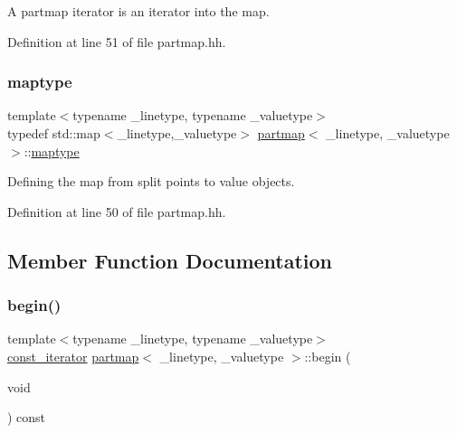 A partmap iterator is an iterator into the map. 



Definition at line 51 of file partmap.\+hh.

\mbox{\label{classpartmap_abdafeca5ddc449596a7d188791b4702f}} 
\subsubsection{\texorpdfstring{maptype}{maptype}}
{\footnotesize\ttfamily template$<$typename \+\_\+linetype, typename \+\_\+valuetype$>$ \\
typedef std\+::map$<$\+\_\+linetype,\+\_\+valuetype$>$ \mbox{\hyperlink{classpartmap}{partmap}}$<$ \+\_\+linetype, \+\_\+valuetype $>$\+::\mbox{\hyperlink{classpartmap_abdafeca5ddc449596a7d188791b4702f}{maptype}}}



Defining the map from split points to value objects. 



Definition at line 50 of file partmap.\+hh.



\subsection{Member Function Documentation}
\mbox{\label{classpartmap_a8c5b499b66156957ec95c209ad1440cc}} 
\subsubsection{\texorpdfstring{begin()}{begin()}\hspace{0.1cm}{\footnotesize\ttfamily [1/4]}}
{\footnotesize\ttfamily template$<$typename \+\_\+linetype, typename \+\_\+valuetype$>$ \\
\mbox{\hyperlink{classpartmap_a01c7ea382b2a493dbd4a4431a2c39520}{const\+\_\+iterator}} \mbox{\hyperlink{classpartmap}{partmap}}$<$ \+\_\+linetype, \+\_\+valuetype $>$\+::begin (\begin{DoxyParamCaption}\item[{void}]{ }\end{DoxyParamCaption}) const\hspace{0.3cm}{\ttfamily [inline]}}



